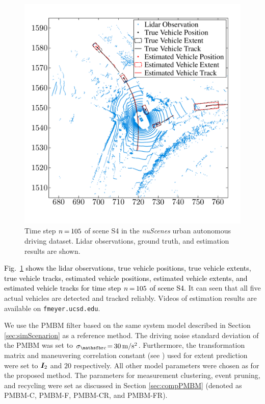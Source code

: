 \documentclass[10pt, twoside, romanappendices]{IEEEtran}
\providecommand{\rd}{\textcolor{black}}
\providecommand{\ist}{\hspace*{.3mm}}
\providecommand{\rmv}{\hspace*{-.3mm}}
\begin{document}
 \begin{figure}[t!]
\centering
\includegraphics[scale=.18]{./Figures/nuscenePlot1.pdf}
\caption{Time step $n \rmv=\rmv 105$ of scene S4 in the \textit{nuScenes} urban autonomous driving dataset. Lidar observations, ground truth, and estimation results are shown. }
\label{fig:nuscenes}
\vspace{1mm}
\end{figure}

\rd{Fig.\ \ref{fig:nuscenes} shows the lidar observations, true vehicle positions, true vehicle extents, true vehicle tracks, estimated vehicle positions, estimated vehicle extents, and estimated vehicle tracks for time step $n\rmv=\rmv105$ of scene S4.} It can seen that all five actual vehicles are detected and tracked reliably. Videos of estimation results are available on \texttt{fmeyer.ucsd.edu}.

We use the PMBM filter based on the same system model described in Section \ref{sec:simScenarion} as a reference method. The driving noise standard deviation of the PMBM was set to $\sigma_{\rv{c}} \!=\rmv 30 \ist\ist \text{m}/\text{s}^2$. Furthermore, the transformation matrix and maneuvering correlation constant (see \cite[Table III]{GraFatSve:J19}) used for extent prediction were set to $\M{I}_2$ and $20$ respectively. All other model parameters were chosen as for the proposed method. The parameters for measurement clustering, event pruning, and recycling were set as discussed in Section \ref{sec:compPMBM} (denoted as PMBM-C, PMBM-F, PMBM-CR, and PMBM-FR).
\end{document}
